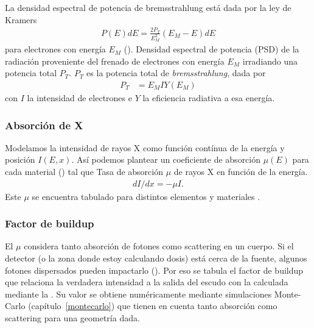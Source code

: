 La densidad espectral de potencia de bremsstrahlung está dada por la ley de
Kramers\cite{kramers_xciii._1923}
\begin{align}
    P(E)dE = \frac{2P_T}{E_M^2}(E_M-E)dE
    \label{eq:kramers}
\end{align} para electrones con energía $E_M$ ().
{Densidad espectral de potencia (PSD) de la radiación proveniente del 
frenado de electrones con energía $E_M$ irradiando una potencia total $P_T$.}
$P_T$ es la potencia total de \emph{bremsstrahlung}, dada por
\begin{align*}
    P_T&=E_MIY(E_M)
\end{align*}con $I$ la intensidad de electrones e $Y$ la eficiencia radiativa a
esa energía.
\subsubsection{Absorción de X}
Modelamos la intensidad de rayos X como función contínua de la energía y
posición $I(E,x)$.
Así podemos plantear un coeficiente de absorción $\mu(E)$ para cada 
material () tal que 
{Tasa de absorción $\mu$ de rayos X en función de la energía\cite{xraycoef}.}
\begin{align}
    \label{eq:absorcionx}
    dI/dx=-\mu I.
\end{align}
Este $\mu$ se encuentra tabulado para distintos elementos y materiales
\cite{xraycoef}.
\subsubsection{Factor de buildup}
El $\mu$ considera tanto absorción de fotones como scattering en un cuerpo.
Si el detector (o la zona donde estoy calculando dosis) 
está cerca de la fuente, 
algunos fotones dispersados pueden impactarlo ().
Por eso se tabula el factor de buildup
que relaciona la verdadera intensidad a la salida del escudo 
con la calculada mediante la .
Su valor se obtiene numéricamente mediante simulaciones Monte-Carlo
(capítulo~\ref{montecarlo})
que tienen en cuenta tanto absorción como scattering
para una geometría dada.
